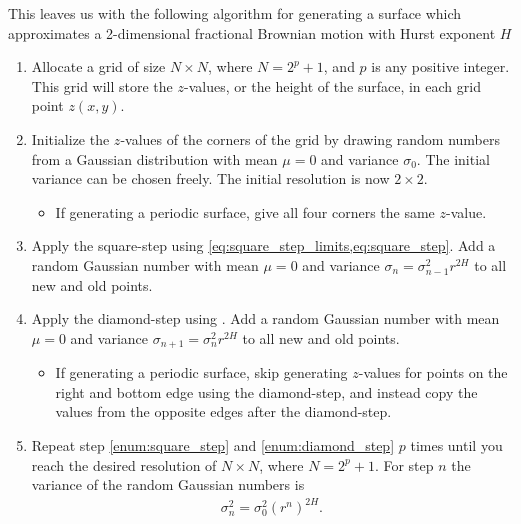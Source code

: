 This leaves us with the following algorithm for generating a surface which approximates a 2-dimensional fractional Brownian motion with Hurst exponent $H$
\begin{enumerate}
    \renewcommand{\labelitemii}{$\bullet$}
    
    \item Allocate a grid of size $N\times N$, where $N = 2^p + 1$, and $p$ is any positive integer. This grid will store the $z$-values, or the height of the surface, in each grid point $z(x,y)$.

    \item Initialize the $z$-values of the corners of the grid by drawing random numbers from a Gaussian distribution with mean $\mu = 0$ and variance $\sigma_0$. The initial variance can be chosen freely. The initial resolution is now $2\times 2$.
    \begin{itemize}
        \item If generating a periodic surface, give all four corners the same $z$-value.
    \end{itemize}
    
    \item Apply the square-step using \cref{eq:square_step_limits,eq:square_step}. Add a random Gaussian number with mean $\mu = 0$ and variance $\sigma_n = \sigma_{n-1}^2r^{2H}$ to all new and old points.
    \label{enum:square_step}

    \item Apply the diamond-step using . Add a random Gaussian number with mean $\mu = 0$ and variance $\sigma_{n+1} = \sigma_n^2r^{2H}$ to all new and old points.
    \label{enum:diamond_step}
    
    \begin{itemize}
        \item If generating a periodic surface, skip generating $z$-values for points on the right and bottom edge using the diamond-step, and instead copy the values from the opposite edges after the diamond-step.
    \end{itemize}
    
    \item Repeat step \ref{enum:square_step} and \ref{enum:diamond_step} $p$ times until you reach the desired resolution of $N\times N$, where $N = 2^p + 1$. For step $n$ the variance of the random Gaussian numbers is
    \begin{align*}
        \sigma_n^2 = \sigma_0^2(r^n)^{2H}.
    \end{align*}
\end{enumerate}


